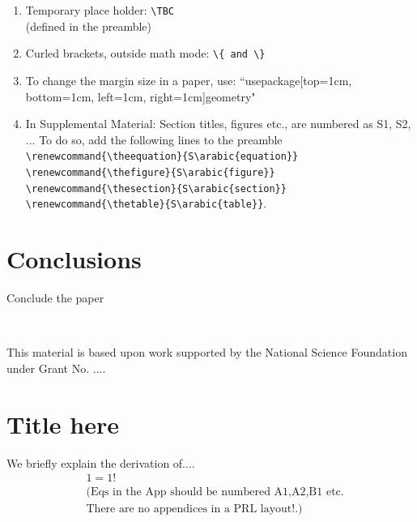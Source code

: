 \documentclass[pre,aps,reprint,noshowpacs,superscriptaddress,floatfix,letterpaper,longbibliography]{revtex4-2}
\newcommand{\TBC}{\magenta{[TBC]}}
\newcommand{\magenta}{\textcolor{magenta}}
\begin{document}
\begin{enumerate}
\item Temporary place holder: \verb|\TBC| \\ (defined in the preamble)

\item Curled brackets, outside math mode: \verb|\{ and \} |

\item To change the margin size in a paper, use: ``usepackage[top=1cm, bottom=1cm, left=1cm, right=1cm]{geometry}"  

\item In Supplemental Material: Section titles, figures etc., are numbered as S1, S2, ... To do so, add the following lines to the preamble 
\verb|\renewcommand{\theequation}{S\arabic{equation}}|
\verb|\renewcommand{\thefigure}{S\arabic{figure}}|
\verb|\renewcommand{\thesection}{S\arabic{section}}|
\verb|\renewcommand{\thetable}{S\arabic{table}}|. 

\label{List:Latex}
\end{enumerate}

\lipsum[2-2]

\section{Conclusions}

Conclude the paper

\lipsum[2-3]
\\ 

\begin{acknowledgments}
This material is based upon work supported by the National Science Foundation under Grant No. ....

\end{acknowledgments}

 

\appendix

\section{Title here}
\label{AppAT} 
We briefly explain the derivation of.... 
\begin{align}
    &1=1!\nonumber\\ 
    &(\text{Eqs in the App should be numbered A1,A2,B1 etc.}\nonumber\\ 
    &\text{There are no appendices in a PRL layout!.)}
\end{align}


\end{document}

